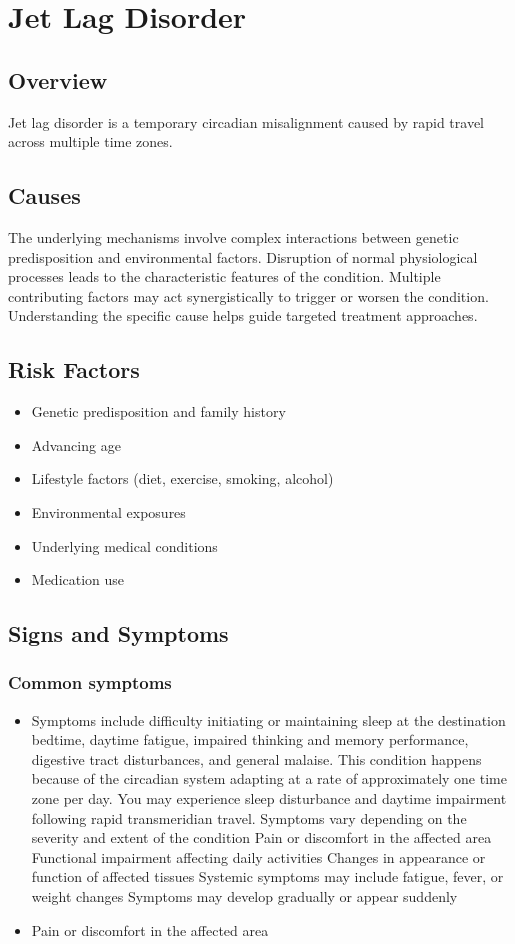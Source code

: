 \chapter{Jet Lag Disorder}
\label{sec:Jet Lag Disorder}

\section{Overview}
Jet lag disorder is a temporary circadian misalignment caused by rapid travel across multiple time zones.
\section{Causes}
The underlying mechanisms involve complex interactions between genetic predisposition and environmental factors. Disruption of normal physiological processes leads to the characteristic features of the condition. Multiple contributing factors may act synergistically to trigger or worsen the condition. Understanding the specific cause helps guide targeted treatment approaches.
\section{Risk Factors}


\begin{itemize}[noitemsep]
  \item Genetic predisposition and family history
  \item Advancing age
  \item Lifestyle factors (diet, exercise, smoking, alcohol)
  \item Environmental exposures
  \item Underlying medical conditions
  \item Medication use
\end{itemize}
\section{Signs and Symptoms}

\subsection{Common symptoms}
\begin{itemize}[noitemsep]
  \item Symptoms include difficulty initiating or maintaining sleep at the destination bedtime, daytime fatigue, impaired thinking and memory performance, digestive tract disturbances, and general malaise. This condition happens because of the circadian system adapting at a rate of approximately one time zone per day. You may experience sleep disturbance and daytime impairment following rapid transmeridian travel. Symptoms vary depending on the severity and extent of the condition Pain or discomfort in the affected area Functional impairment affecting daily activities Changes in appearance or function of affected tissues Systemic symptoms may include fatigue, fever, or weight changes Symptoms may develop gradually or appear suddenly
  \item Pain or discomfort in the affected area
  \end{itemize}


